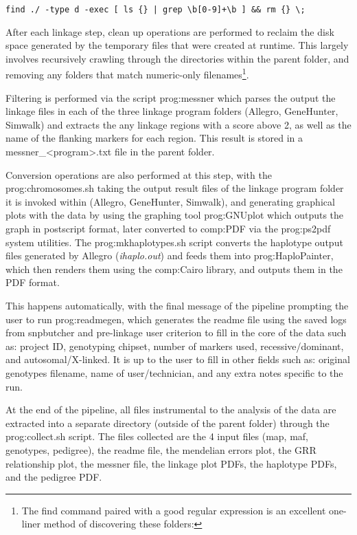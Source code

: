 \begin{lrbox}\scriptsize
    \verb!find ./ -type d -exec [ ls {} | grep \b[0-9]+\b ] && rm {} \;!
\end{lrbox}%

After each linkage step, clean up operations are performed to reclaim the disk space generated by the temporary files that were created at runtime. This largely involves recursively crawling through the directories within the parent folder, and removing any folders that match numeric-only filenames\footnote{The find command paired with a good regular expression is an excellent one-liner method of discovering these folders: \usebox{}}.

Filtering is performed via the script \gls{prog:messner} which parses the output the linkage files in each of the three linkage program folders (Allegro, GeneHunter, Simwalk) and extracts the any linkage regions with a score above 2, as well as the name of the flanking markers for each region. This result is stored in a messner\_<program>.txt file in the parent folder.

Conversion operations are also performed at this step, with the \gls{prog:chromosomes.sh} taking the output result files of the linkage program folder it is invoked within (Allegro, GeneHunter, Simwalk), and generating graphical plots with the data by using the graphing tool \gls{prog:GNUplot} which outputs the graph in postscript format, later converted to \gls{comp:PDF} via the \gls{prog:ps2pdf} system utilities. The \gls{prog:mkhaplotypes.sh} script converts the haplotype output files generated by Allegro (\textit{ihaplo.out}) and feeds them into \gls{prog:HaploPainter}, which then renders them using the \gls{comp:Cairo} library, and outputs them in the PDF format.

This happens automatically, with the final message of the pipeline prompting the user to run \gls{prog:readmegen}, which generates the readme file using the saved logs from snpbutcher and pre-linkage user criterion to fill in the core of the data such as: project ID, genotyping chipset, number of markers used, recessive/dominant, and autosomal/X-linked. It is up to the user to fill in other fields such as: original genotypes filename, name of user/technician, and any extra notes specific to the run.

At the end of the pipeline, all files instrumental to the analysis of the data are extracted into a separate directory (outside of the parent folder) through the \gls{prog:collect.sh} script. The files collected are the 4 input files (map, maf, genotypes, pedigree), the readme file, the mendelian errors plot, the GRR relationship plot, the messner file, the linkage plot PDFs, the haplotype PDFs, and the pedigree PDF.


